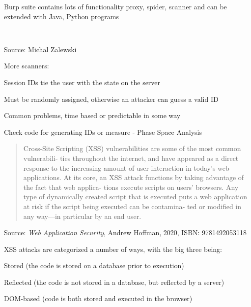 \documentclass[Screen16to9,17pt]{foils}
\begin{document}
Burp suite contains lots of functionality proxy, spider, scanner and can be extended with Java, Python programs

\\




Source: Michal Zalewski 

More scanners:\\
{\small {}}




\begin{list2}
\item Session IDs tie the user with the state on the server
\item Must be randomly assigned, otherwise an attacker can guess a valid ID
\item Common problems, time based or predictable in some way
\item Check code for generating IDs or measure - Phase Space Analysis
\end{list2}


\begin{quote}\small
  Cross-Site Scripting (XSS) vulnerabilities are some of the most common vulnerabili‐
  ties throughout the internet, and have appeared as a direct response to the increasing
  amount of user interaction in today’s web applications.
  At its core, an XSS attack functions by taking advantage of the fact that web applica‐
  tions execute scripts on users’ browsers. Any type of dynamically created script that is
  executed puts a web application at risk if the script being executed can be contamina‐
  ted or modified in any way—in particular by an end user.
\end{quote}
Source: \emph{Web Application Security}, Andrew Hoffman, 2020, ISBN: 9781492053118

XSS attacks are categorized a number of ways, with the big three being:
\begin{list2}
\item Stored (the code is stored on a database prior to execution)
\item Reflected (the code is not stored in a database, but reflected by a server)
\item DOM-based (code is both stored and executed in the browser)
\end{list2}
\end{document}
